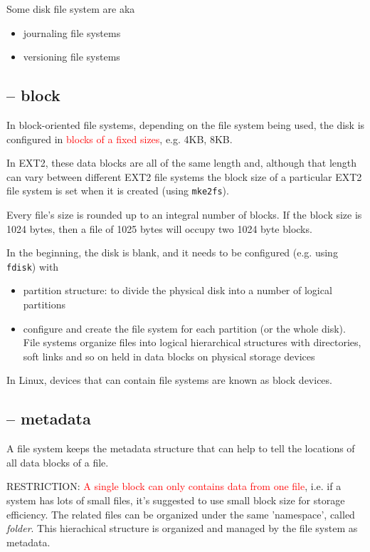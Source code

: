 Some disk file system are aka
\begin{itemize}
  \item journaling file systems
  \item versioning file systems
\end{itemize} 



\subsection{-- block}
\label{sec:block-size-in-a-block-oriented-filesystem}

In block-oriented file systems, depending on the file system being used, the
disk is configured in \textcolor{red}{blocks of a fixed sizes}, e.g. 4KB, 8KB.

In EXT2, these data blocks are all of the same length and, although that
length can vary between different EXT2 file systems the block size of a
particular EXT2 file system is set when it is created (using \verb!mke2fs!).

Every file's size is rounded up to an integral number of blocks. If the block
size is 1024 bytes, then a file of 1025 bytes will occupy two 1024 byte blocks.
  
In the beginning, the disk is blank, and it needs to be configured (e.g. using
\verb!fdisk!) with
\begin{itemize}
  \item partition structure: to divide the physical disk into a number of
  logical partitions
  \item configure and create the file system for each partition (or the whole
  disk). File systems organize files into logical hierarchical structures with
  directories, soft links and so on held in data blocks on physical
  storage devices
\end{itemize}
In Linux, devices that can contain file systems are known as block devices. 


\subsection{-- metadata}
\label{sec:metadata-in-a-block-oriented-filesystem}

A file system keeps the metadata structure that can help to tell the
locations of all data blocks of a file.

RESTRICTION: \textcolor{red}{A single block can only contains data from one
file}, i.e. if a system has lots of small files, it's suggested to use small
block size for storage efficiency. The related files can be organized under the
same 'namespace', called {\it folder}. This hierachical structure is organized
and managed by the file system as metadata.

